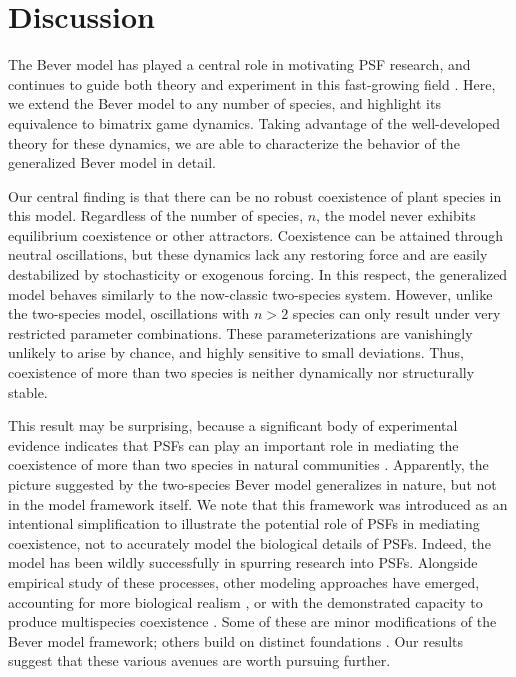 \documentclass[11pt]{article}
\begin{document}
\section{Discussion}

The Bever model has played a central role in motivating PSF research, and continues to guide both theory and experiment in this fast-growing field \citep{bever2015maintenance, kandlikar2019winning, ke2020effects}. Here, we extend the Bever model to any number of species, and highlight its equivalence to bimatrix game dynamics. Taking advantage of the well-developed theory for these dynamics, we are able to characterize the behavior of the generalized Bever model in detail.

Our central finding is that there can be no robust coexistence of plant species in this model. Regardless of the number of species, $n$, the model never exhibits equilibrium coexistence or other attractors. Coexistence can be attained through neutral oscillations, but these dynamics lack any restoring force and are easily destabilized by stochasticity or exogenous forcing. In this respect, the generalized model behaves similarly to the now-classic two-species system. However, unlike the two-species model, oscillations with $n > 2$ species can only result under very restricted parameter combinations. These parameterizations are vanishingly unlikely to arise by chance, and highly sensitive to small deviations. Thus, coexistence of more than two species is neither dynamically nor structurally stable.

This result may be surprising, because a significant body of experimental evidence indicates that PSFs can play an important role in mediating the coexistence of more than two species in natural communities \citep{kulmatiski2008plant,petermann2008janzen,mangan2010negative,bever2015maintenance}. Apparently, the picture suggested by the two-species Bever model generalizes in nature, but not in the model framework itself. We note that this framework was introduced as an intentional simplification to illustrate the potential role of PSFs in mediating coexistence, not to accurately model the biological details of PSFs. Indeed, the model has been wildly successfully in spurring research into PSFs. Alongside empirical study of these processes, other modeling approaches have emerged, accounting for more biological realism \citep[e.g.,][]{umbanhowar2005simple,eppstein2007invasiveness,bever2010rooting}, or with the demonstrated capacity to produce multispecies coexistence  \citep[e.g.,][]{bonanomi2005negative,miller2021metapopulations}. Some of these are minor modifications of the Bever model framework; others build on distinct foundations \citep{ke2015incorporating,ke2020effects}. Our results suggest that these various avenues are worth pursuing further.
\end{document}

